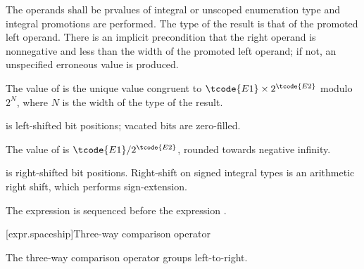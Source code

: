 The operands shall be prvalues of integral or unscoped enumeration type and integral
promotions are performed. The type of the result is that of the promoted
left operand.
%
There is an implicit precondition that
the right operand is nonnegative and
less than the width of the promoted left operand;
if not, an unspecified erroneous value is produced.
%
%
%
%
%

\pnum
The value of  is the unique value congruent to
$\tcode{E1} \times 2^\tcode{E2}$ modulo $2^N$,
where $N$ is the width of the type of the result.
\begin{note}
 is left-shifted  bit positions;
vacated bits are zero-filled.
\end{note}

\pnum
The value of  is $\tcode{E1} / 2^\tcode{E2}$,
rounded towards negative infinity.
\begin{note}
 is right-shifted  bit positions.
Right-shift on signed integral types is an arithmetic right shift,
which performs sign-extension.
\end{note}

\pnum
The expression  is sequenced before the expression .

[expr.spaceship]{Three-way comparison operator}
%
%

\pnum
The three-way comparison operator groups left-to-right.

